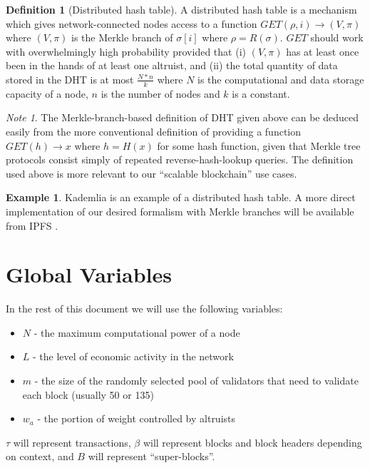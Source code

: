 \documentclass[11pt,a4paper]{report}
\theoremstyle{plain}
\theoremstyle{definition}
\newtheorem{defn}{Definition}[chapter]
\newtheorem{exmp}{Example}[section]
\theoremstyle{remark}
\newtheorem*{note}{Note}
\begin{document}
\begin{defn}[Distributed hash table]
A distributed hash table is a mechanism which gives network-connected nodes access to a function $GET(\rho, i) \rightarrow (V, \pi)$ where $(V, \pi)$ is the Merkle branch of $\sigma[i]$ where $\rho = R(\sigma)$. $GET$ should work with overwhelmingly high probability provided that (i) $(V, \pi)$ has at least once been in the hands of at least one altruist, and (ii) the total quantity of data stored in the DHT is at most $\frac{N * n}{k}$ where $N$ is the computational and data storage capacity of a node, $n$ is the number of nodes and $k$ is a constant.
\end{defn}

\begin{note}
The Merkle-branch-based definition of DHT given above can be deduced easily from the more conventional definition of providing a function $GET(h) \rightarrow x$ where $h = H(x)$ for some hash function, given that Merkle tree protocols consist simply of repeated reverse-hash-lookup queries. The definition used above is more relevant to our ``scalable blockchain'' use cases.
\end{note}

\begin{exmp}
Kademlia \cite{kademlia} is an example of a distributed hash table. A more direct implementation of our desired formalism with Merkle branches will be available from IPFS \cite{ipfs}.
\end{exmp}

\chapter{Global Variables}

In the rest of this document we will use the following variables:

\begin{itemize}
\item
$N$ - the maximum computational power of a node
\item
$L$ - the level of economic activity in the network
\item
$m$ - the size of the randomly selected pool of validators that need to validate each block (usually 50 or 135)
\item
$w_a$ - the portion of weight controlled by altruists
\end{itemize}

$\tau$ will represent transactions, $\beta$ will represent blocks and block headers depending on context, and $B$ will represent ``super-blocks''.
\end{document}
